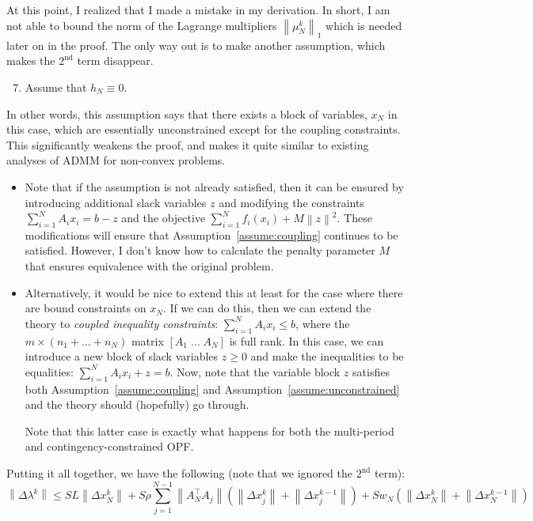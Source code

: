 \documentclass[11pt]{article}
\newcommand{\norm}[1]{\left\lVert #1 \right\rVert}
\begin{document}
{\color{magenta}At this point, I realized that I made a mistake in my derivation. In short, I am not able to bound the norm of the Lagrange multipliers $\norm{\mu_{N}^k}_1$ which is needed later on in the proof. The only way out is to make another assumption, which makes the $2^\text{nd}$ term disappear.
\begin{enumerate}\setcounter{enumi}{6}
    \item\label{assume:unconstrained} Assume that $h_N \equiv 0$.
\end{enumerate}
In other words, this assumption says that there exists a block of variables, $x_N$ in this case, which are essentially unconstrained except for the coupling constraints.
This significantly weakens the proof, and makes it quite similar to existing analyses of ADMM for non-convex problems.

\begin{itemize}
    \item Note that if the assumption is not already satisfied, then it can be ensured by introducing additional slack variables $z$ and modifying the constraints $\sum_{i = 1}^N A_i x_i = b - z$ and the objective $\sum_{i = 1}^N f_i(x_i) + M \norm{z}^2$.
    These modifications will ensure that Assumption~\eqref{assume:coupling} continues to be satisfied.
    However, I don't know how to calculate the penalty parameter $M$ that ensures equivalence with the original problem.
    
    \item Alternatively, it would be nice to extend this at least for the case where there are bound constraints on $x_N$. If we can do this, then we can extend the theory to \emph{coupled inequality constraints}: $\sum_{i = 1}^N A_i x_i \leq b$, where the $m \times (n_1 + \ldots + n_N)$ matrix $\left[A_1 \; \ldots \; A_N\right]$ is full rank. In this case, we can introduce a new block of slack variables $z \geq 0$ and make the inequalities to be equalities: $\sum_{i = 1}^N A_i x_i + z = b$. Now, note that the variable block $z$ satisfies both Assumption~\ref{assume:coupling} and Assumption~\ref{assume:unconstrained} and the theory should (hopefully) go through.
    
    Note that this latter case is exactly what happens for both the multi-period and contingency-constrained OPF.
\end{itemize}
}

Putting it all together, we have the following (note that we ignored the $2^\text{nd}$ term):
\begin{equation}\label{eq:delta_lambda}
\norm{\Delta \lambda^k} \leq SL \norm{\Delta x_N^k} + S\rho \sum_{j = 1}^{N-1} \norm{A_N^\top A_j} \left(\norm{\Delta x_j^k} + \norm{\Delta x_j^{k - 1}} \right) + Sw_N\left(\norm{\Delta x_N^k} + \norm{\Delta x_N^{k-1}}\right)
\end{equation}
\end{document}
